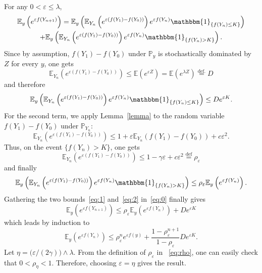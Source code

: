 \documentclass{amsart}
\def\E{\mathbb{E}}
\def\P{\mathbb{P}}
\newcommand{\ind}[1]{\mathbbm{1}_{\{#1\}}}
\begin{document}
\noindent
For any $0 < \varepsilon \leq \lambda$,
\begin{multline} \label{eq:0}
    \E_y \left( e^{\varepsilon f(Y_{n+1})} \right)
    = \E_y \left( \E_{Y_n} \left( e^{\varepsilon (f(Y_{1}) - f(Y_0))}
    \right) e^{\varepsilon f(Y_n)} \ind{f(Y_n) \leq K} \right)\\
    + \E_y \left( \E_{Y_n} \left( e^{\varepsilon (f(Y_1) - f(Y_0))}
    \right) e^{\varepsilon f(Y_n)} \ind{f(Y_n) > K} \right).
\end{multline}
Since by assumption, $f(Y_{1}) - f(Y_0)$ under $\P_{y}$ is
stochastically dominated by $Z$ for every $y$, one gets
\[
    \E_{Y_n} \left( e^{\varepsilon (f(Y_{1}) - f(Y_0))} \right) \leq \E \left( e^{\varepsilon Z} \right) = \E \left( e^{\lambda Z} \right) \stackrel{\text{def.}}{=} D
\]
and therefore
\begin{equation} \label{eq:1}
    \E_y \left( \E_{Y_n} \left( e^{\varepsilon (f(Y_{1}) - f(Y_0))} \right) e^{\varepsilon f(Y_n)} \ind{f(Y_n) \leq K} \right) \leq D e^{\varepsilon K}.
\end{equation}
For the second term, we apply Lemma~\ref{lemma} to the random
variable $f(Y_1) - f(Y_0)$ under $\P_{Y_n}$:
\[
    \E_{Y_n} \left( e^{\varepsilon (f(Y_1) - f(Y_0))} \right) \leq 1 + \varepsilon \E_{Y_n} (f(Y_1) - f(Y_0)) + c \varepsilon^2.
\]
Thus, on the event $\{ f(Y_n) > K \}$, one gets
\begin{equation} \label{eq:rho}
    \E_{Y_n} \left( e^{\varepsilon (f(Y_1) - f(Y_0))} \right)
    \leq 1 -\gamma \varepsilon + c \varepsilon^2 \stackrel{\text{def}}{=} \rho_\varepsilon
\end{equation}
and finally
\begin{equation} \label{eq:2}
    \E_y \left( \E_{Y_n} \left( e^{\varepsilon (f(Y_{1}) - f(Y_0))} \right) e^{\varepsilon f(Y_n)} \ind{f(Y_n) > K} \right)
    \leq \rho_\varepsilon \E_y \left( e^{\varepsilon f(Y_n)} \right).
\end{equation}
Gathering the two bounds~\eqref{eq:1} and~\eqref{eq:2}
in~\eqref{eq:0} finally gives
\[ \E_y \left( e^{\varepsilon f(Y_{n+1})} \right)
\leq \rho_\varepsilon \E_y \left( e^{\varepsilon f(Y_n)} \right) + D
e^{\varepsilon K} \] which leads by induction to
\[ \E_y \left( e^{\varepsilon f(Y_{n})} \right) \leq \rho_\varepsilon^n e^{\varepsilon f(y)} + \frac{1-\rho_\varepsilon^{n+1}}{1-\rho_\varepsilon}D e^{\varepsilon K}. \]
Let $\eta = \big (\varepsilon / (2\gamma) \big) \wedge \lambda$.
From the definition of $\rho_\varepsilon$ in ~\eqref{eq:rho}, one
can easily check that $0 < \rho_\eta < 1$. Therefore, choosing
$\varepsilon = \eta$ gives the result.
\end{document}
